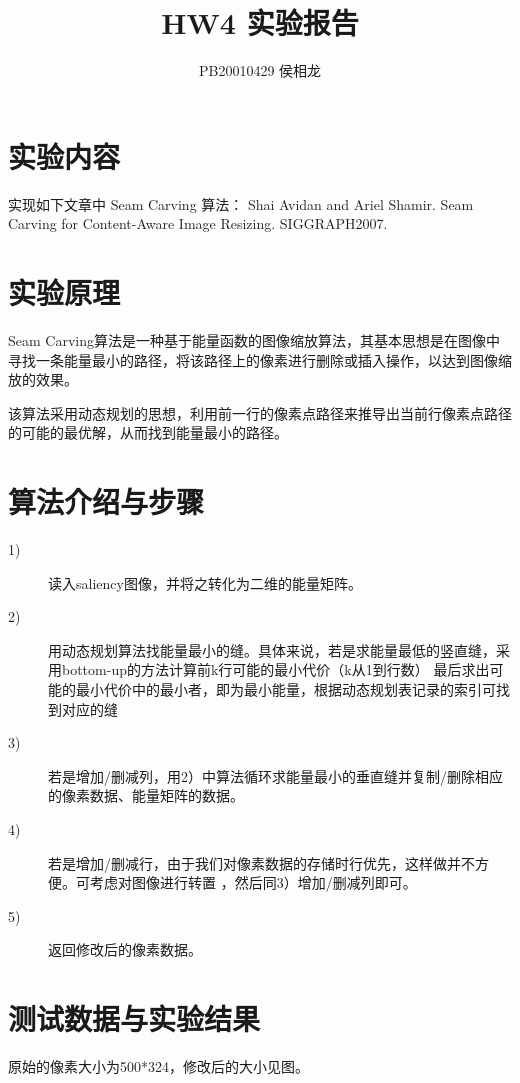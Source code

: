 \documentclass{article}
\title{HW4 实验报告}
\author{PB20010429 侯相龙}
\begin{document}
\maketitle
\section{实验内容}
实现如下文章中 Seam Carving 算法：
Shai Avidan and Ariel Shamir. Seam Carving for Content-Aware Image Resizing. 
SIGGRAPH2007.


\section{实验原理}
Seam Carving算法是一种基于能量函数的图像缩放算法，其基本思想是在图像中寻找一条能量最小的路径，将该路径上的像素进行删除或插入操作，以达到图像缩放的效果。

该算法采用动态规划的思想，利用前一行的像素点路径来推导出当前行像素点路径的可能的最优解，从而找到能量最小的路径。
\section{算法介绍与步骤}
\begin{description}
    \item[1)]读入saliency图像，并将之转化为二维的能量矩阵。
    \item[2)]用动态规划算法找能量最小的缝。具体来说，若是求能量最低的竖直缝，采用bottom-up的方法计算前k行可能的最小代价（k从1到行数）
    最后求出可能的最小代价中的最小者，即为最小能量，根据动态规划表记录的索引可找到对应的缝
    \item[3)]若是增加/删减列，用2）中算法循环求能量最小的垂直缝并复制/删除相应的像素数据、能量矩阵的数据。
    \item[4)]若是增加/删减行，由于我们对像素数据的存储时行优先，这样做并不方便。可考虑对图像进行转置
    ，然后同3）增加/删减列即可。
    \item[5)] 返回修改后的像素数据。
\end{description}


\section{测试数据与实验结果}
原始的像素大小为500*324，修改后的大小见图。

\end{document}

